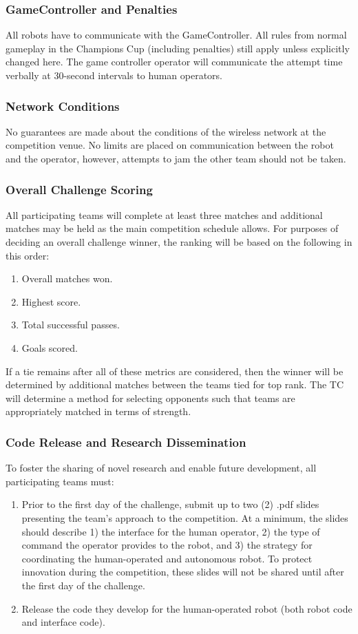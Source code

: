 \subsubsection{GameController and Penalties}
All robots have to communicate with the GameController. All rules from normal gameplay in the Champions Cup (including penalties) still apply unless explicitly changed here. The game controller operator will communicate the attempt time verbally at 30-second intervals to human operators.

\subsubsection{Network Conditions}
No guarantees are made about the conditions of the wireless network at the competition venue. No limits are placed on communication between the robot and the operator, however, attempts to jam the other team should not be taken. 

\subsubsection{Overall Challenge Scoring}
All participating teams will complete at least three matches and additional matches may be held as the main competition schedule allows. For purposes of deciding an overall challenge winner, the ranking will be based on the following in this order:

\begin{enumerate}
	\item Overall matches won.
	\item Highest score.
	\item Total successful passes.
	\item Goals scored.
\end{enumerate}

If a tie remains after all of these metrics are considered, then the winner will be determined by additional matches between the teams tied for top rank. The TC will determine a method for selecting opponents such that teams are appropriately matched in terms of strength.

\subsubsection{Code Release and Research Dissemination}
To foster the sharing of novel research and enable future development, all participating teams must:
\begin{enumerate}
	\item Prior to the first day of the challenge, submit up to two (2) .pdf slides presenting the team's approach to the competition. At a minimum, the slides should describe 1) the interface for the human operator, 2) the type of command the operator provides to the robot, and 3) the strategy for coordinating the human-operated and autonomous robot. To protect innovation during the competition, these slides will not be shared until after the first day of the challenge.
	\item  Release the code they develop for the human-operated robot (both robot code and interface code).
\end{enumerate}

